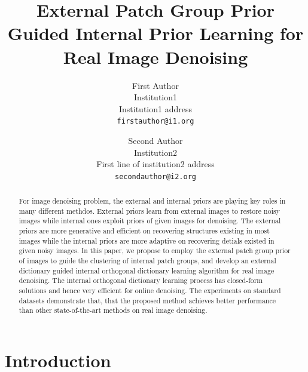 \documentclass[10pt,twocolumn,letterpaper]{article}
\begin{document}
\title{External Patch Group Prior Guided Internal Prior Learning for Real Image Denoising}

\author{First Author\\
Institution1\\
Institution1 address\\
{\tt\small firstauthor@i1.org}
\and
Second Author\\
Institution2\\
First line of institution2 address\\
{\tt\small secondauthor@i2.org}
}

\maketitle 


\begin{abstract}
For image denoising problem, the external and internal priors are playing key roles in many different methdos. External priors learn from external images to restore noisy images while internal ones exploit priors of given images for denoising. The external priors are more generative and efficient on recovering structures existing in most images while the internal priors are more adaptive on recovering detials existed in given noisy images. In this paper, we propose to employ the external patch group prior of images to guide the clustering of internal patch groups, and develop an external dictionary guided internal orthogonal dictionary learning algorithm for real image denoising. The internal orthogonal dictionary learning process has closed-form solutions and hence very efficient for online denoising. The experiments on standard datasets demonstrate that, that the proposed method achieves better performance than other state-of-the-art methods on real image denoising. 
\end{abstract}

\section{Introduction} 
\end{document}
